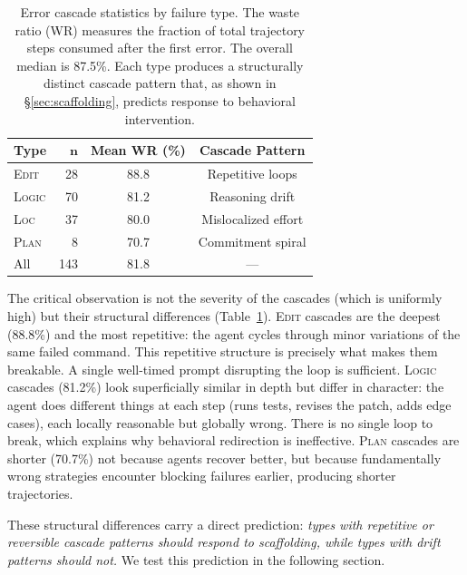 \documentclass[11pt]{article}
\begin{document}
\begin{table}[t]
\centering
\small
\begin{tabular}{@{}lrcc@{}}
\toprule
\textbf{Type} & $\boldsymbol{n}$ & \textbf{Mean WR (\%)} & \textbf{Cascade Pattern} \\
\midrule
\textsc{Edit} & 28 & 88.8 & Repetitive loops \\
\textsc{Logic} & 70 & 81.2 & Reasoning drift \\
\textsc{Loc} & 37 & 80.0 & Mislocalized effort \\
\textsc{Plan} & 8 & 70.7 & Commitment spiral \\
\midrule
All & 143 & 81.8 & --- \\
\bottomrule
\end{tabular}
\caption{Error cascade statistics by failure type. The waste ratio (WR) measures the fraction of total trajectory steps consumed after the first error. The overall median is 87.5\%. Each type produces a structurally distinct cascade pattern that, as shown in \S\ref{sec:scaffolding}, predicts response to behavioral intervention.}
\label{tab:cascade}
\end{table}


The critical observation is not the severity of the cascades (which is uniformly high) but their structural differences (Table~\ref{tab:cascade}).
\textsc{Edit} cascades are the deepest (88.8\%) and the most repetitive: the agent cycles through minor variations of the same failed command.
This repetitive structure is precisely what makes them breakable. A single well-timed prompt disrupting the loop is sufficient.
\textsc{Logic} cascades (81.2\%) look superficially similar in depth but differ in character: the agent does different things at each step (runs tests, revises the patch, adds edge cases), each locally reasonable but globally wrong.
There is no single loop to break, which explains why behavioral redirection is ineffective.
\textsc{Plan} cascades are shorter (70.7\%) not because agents recover better, but because fundamentally wrong strategies encounter blocking failures earlier, producing shorter trajectories.

These structural differences carry a direct prediction: \textit{types with repetitive or reversible cascade patterns should respond to scaffolding, while types with drift patterns should not.}
We test this prediction in the following section.
\end{document}

